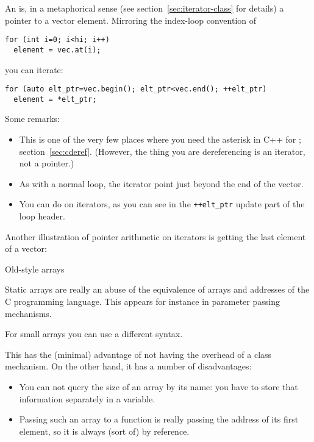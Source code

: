 An  is, in a metaphorical sense (see
section~\ref{sec:iterator-class} for details) a pointer to a vector
element. Mirroring the index-loop convention of
\begin{lstlisting}
for (int i=0; i<hi; i++)
  element = vec.at(i);
\end{lstlisting}
you can iterate:
\begin{lstlisting}
for (auto elt_ptr=vec.begin(); elt_ptr<vec.end(); ++elt_ptr)
  element = *elt_ptr;
\end{lstlisting}
Some remarks:
\begin{itemize}
\item This is one of the very few places where you need the asterisk in C++
  for ; section~\ref{sec:cderef}. (However,
  the thing you are dereferencing is an iterator, not a pointer.)
\item As with a normal loop, the  iterator point just beyond the end
  of the vector.
\item You can do  on iterators, as
  you can see in the \verb-++elt_ptr- update part of the loop header.
\end{itemize}
Another illustration of pointer arithmetic on iterators is getting the
last element of a vector:
%

 {Old-style arrays}
\label{sec:staticarray}

Static arrays are really an abuse of the equivalence of arrays and
addresses of the C programming language. This appears for instance in
parameter passing mechanisms.

For small arrays you can use a different syntax. 


This has the
(minimal) advantage of not having the overhead of a class
mechanism. On the other hand, it has a number of disadvantages:
\begin{itemize}
\item You can not query the size of an array by its name: you have to
  store that information separately in a variable.
\item Passing such an array to a function is really passing the
  address of its first element, so it is always (sort of) by
  reference.
\end{itemize}


